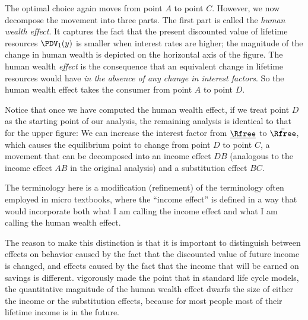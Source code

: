 \documentclass{scrartcl}
\begin{document}
  The optimal choice again moves from point $A$ to point $C$.
  However, we now decompose the movement into three parts.
  The first part is called the \textit{human wealth effect}.
  It captures the fact that the present discounted value of lifetime resources $\PDV_{1}(y)$ is smaller when interest rates are higher; the magnitude of the change in human wealth is depicted on the horizontal axis of the figure.
  The human wealth \textit{effect} is the consequence that an equivalent change in lifetime resources would have \textit{in the absence of any change in interest factors}.
  So the human wealth effect takes the consumer from point $A$ to point $D$.

  Notice that once we have computed the human wealth effect, if we treat point $D$ as the starting point of our analysis, the remaining analysis is identical to that for the upper figure: We can increase the interest factor from $\underline{\Rfree}$ to $\bar{\Rfree}$, which causes the equilibrium point to change from point $D$ to point $C$, a movement that can be decomposed into an income effect $DB$ (analogous to the income effect $AB$ in the original analysis) and a substitution effect $BC$.

  The terminology here is a modification (refinement) of the terminology often employed in micro textbooks, where the ``income effect'' is defined in a way that would incorporate both what I am calling the income effect and what I am calling the human wealth effect.

  The reason to make this distinction is that it is important to distinguish between effects on behavior caused by the fact that the discounted value of future income is changed, and effects caused by the fact that the income that will be earned on savings is different.
  \cite{summersCapTax} vigorously made the point that in standard life cycle models, the quantitative magnitude of the human wealth effect dwarfs the size of either the income or the substitution effects, because for most people most of their lifetime income is in the future.
\end{document}
